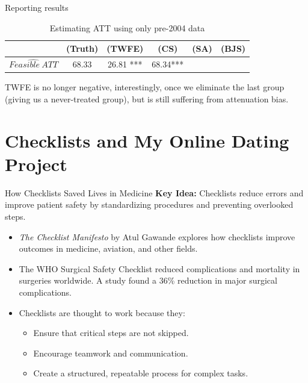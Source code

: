 \documentclass{beamer}
\begin{document}
\begin{frame}{Reporting results}
\begin{table}[htbp]\centering
\small
\caption{Estimating ATT using only pre-2004 data}
\begin{center}
\begin{tabular}{l*{5}{c}}
\hline
\multicolumn{1}{l}{\textbf{}}&
\multicolumn{1}{c}{\textbf{(Truth)}}&
\multicolumn{1}{c}{\textbf{(TWFE)}}&
\multicolumn{1}{c}{\textbf{(CS)}}&
\multicolumn{1}{c}{\textbf{(SA)}}&
\multicolumn{1}{c}{\textbf{(BJS)}}\\
\hline
$\widehat{Feasible\ ATT}$  & 68.33    & 26.81 *** & 68.34*** &&\\
\hline
\end{tabular}
\end{center}
\end{table}

TWFE is no longer negative, interestingly, once we eliminate the last group (giving us a never-treated group), but is still suffering from attenuation bias. 

\end{frame}




\section{Checklists and My Online Dating Project}


\begin{frame}{How Checklists Saved Lives in Medicine}
    \textbf{Key Idea:} Checklists reduce errors and improve patient safety by standardizing procedures and preventing overlooked steps.

    \begin{itemize}
        \item 
	\textit{The Checklist Manifesto} by Atul Gawande explores how checklists improve outcomes in medicine, aviation, and other fields.
        \item 
	The WHO Surgical Safety Checklist reduced complications and mortality in surgeries worldwide. A study found a 36\% reduction in major surgical complications.
        \item 
	Checklists are thought to work because they:
        \begin{itemize}
            \item Ensure that critical steps are not skipped.
            \item Encourage teamwork and communication.
            \item Create a structured, repeatable process for complex tasks.
        \end{itemize}
    \end{itemize}


\end{frame}
\end{document}
